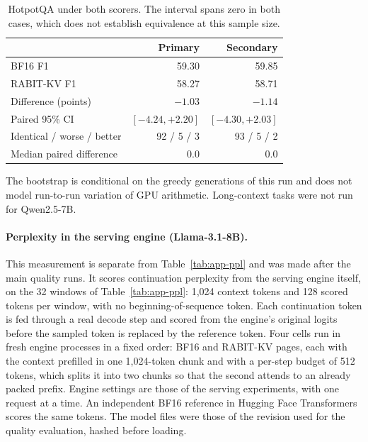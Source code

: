 \documentclass{article}
\begin{document}
\begin{table}[h]
\centering
\small
\setlength{\tabcolsep}{3.5pt}
\begin{tabular}{@{}lrr@{}}
\toprule
 & Primary & Secondary \\
\midrule
BF16 F1 & 59.30 & 59.85 \\
RABIT-KV F1 & 58.27 & 58.71 \\
Difference (points) & $-1.03$ & $-1.14$ \\
Paired 95\% CI & $[-4.24, +2.20]$ & $[-4.30, +2.03]$ \\
Identical / worse / better & 92 / 5 / 3 & 93 / 5 / 2 \\
Median paired difference & 0.0 & 0.0 \\
\bottomrule
\end{tabular}
\caption{HotpotQA under both scorers. The interval spans zero in both cases, which does not establish
equivalence at this sample size.}
\label{tab:app-hotpot}
\end{table}

The bootstrap is conditional on the greedy generations of this run and does not model run-to-run
variation of GPU arithmetic. Long-context tasks were not run for Qwen2.5-7B.

\paragraph{Perplexity in the serving engine (Llama-3.1-8B).}
This measurement is separate from Table~\ref{tab:app-ppl} and was made after the main quality runs. It
scores continuation perplexity from the serving engine itself, on the 32 windows of
Table~\ref{tab:app-ppl}: 1,024 context tokens and 128 scored tokens per window, with no
beginning-of-sequence token. Each continuation token is fed through a real decode step and scored from
the engine's original logits before the sampled token is replaced by the reference token. Four cells
run in fresh engine processes in a fixed order: BF16 and RABIT-KV pages, each with the context
prefilled in one 1,024-token chunk and with a per-step budget of 512 tokens, which splits it into two
chunks so that the second attends to an already packed prefix. Engine settings are those of the serving
experiments, with one request at a time. An independent BF16 reference in Hugging Face Transformers
scores the same tokens. The model files were those of the revision used for the quality evaluation,
hashed before loading.
\end{document}
